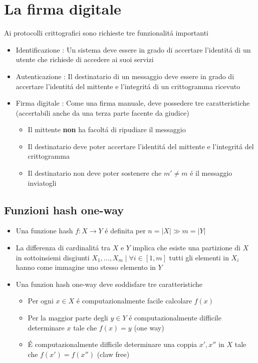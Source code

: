 \chapter{La firma digitale}

Ai protocolli crittografici sono richieste tre funzionalit\'a importanti

\begin{itemize}
    \item Identificazione : Un sistema deve essere in grado di accertare l'identit\'a di un utente che richiede di accedere ai suoi servizi
    \item Autenticazione : Il destinatario di un messaggio deve essere in grado di accertare l'identit\'a del mittente e l'integrit\'a di un crittogramma ricevuto
    \item Firma digitale : Come una firma manuale, deve possedere tre caratteristiche (accertabili anche da una terza parte facente da giudice)
    \begin{itemize}
        \item Il mittente \textbf{non} ha facolt\'a di ripudiare il messaggio
        \item Il destinatario deve poter accertare l'identit\'a del mittente e l'integrit\'a del crittogramma
        \item Il destinatario non deve poter sostenere che $m' \not= m$ \'e il messaggio inviatogli
    \end{itemize}
\end{itemize}

\section{Funzioni hash one-way}

\begin{itemize}
    \item Una funzione hash $f : X \to Y$ \'e definita per $n = |X| \gg m = |Y|$
    \item La differenza di cardinalit\'a tra $X$ e $Y$ implica che esiste una partizione di $X$ in sottoinsiemi disgiunti $X_1,\dots,X_m \mid \forall i \in [1,m]$ tutti gli elementi in $X_i$ hanno come immagine uno stesso elemento in $Y$
    \item Una funzion hash one-way deve soddisfare tre caratteristiche
    \begin{itemize}
        \item Per ogni $x \in X$ \'e computazionalmente facile calcolare $f(x)$
        \item Per la maggior parte degli $y \in Y$ \'e computazionalmente difficile determinare $x$ tale che $f(x) = y$ (one way)
        \item \'E computazionalmente difficile determinare una coppia $x', x''$ in $X$ tale che $f(x') = f(x'')$ (claw free)
    \end{itemize}
\end{itemize}

